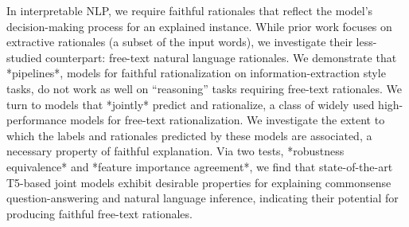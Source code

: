 In interpretable NLP, we require faithful rationales that reflect the model's decision-making process for an explained instance. While prior work focuses  on extractive rationales (a subset of the input words), we investigate their less-studied counterpart: free-text natural language rationales. We demonstrate that *pipelines*, models for faithful rationalization on information-extraction style tasks, do not work as well on ``reasoning'' tasks requiring free-text rationales. We turn to models that *jointly* predict and rationalize, a class of widely used high-performance models for free-text rationalization. We investigate the extent to which the labels and rationales predicted by these models are associated, a necessary property of faithful explanation. Via two tests, *robustness equivalence* and *feature importance agreement*, we find that state-of-the-art T5-based joint models exhibit desirable properties for explaining commonsense question-answering and natural language inference, indicating their potential for producing faithful free-text rationales.

